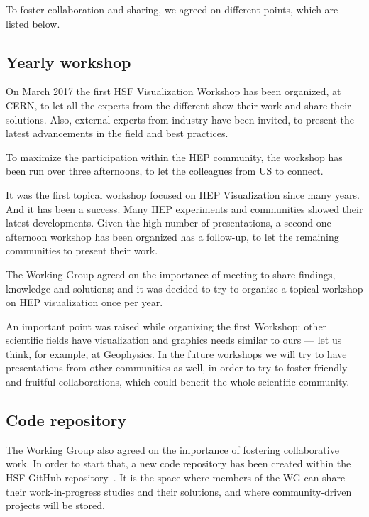\documentclass[12pt,a4paper]{article}
\begin{document}
To foster collaboration and sharing, we agreed on different points, which are listed below.

\hypertarget{workshop}{%
\subsection{Yearly workshop}\label{workshop}}

On March 2017 the first HSF Visualization Workshop has been organized, at CERN, to let all the experts from the different
show their work and share their solutions. Also, external experts from industry have been invited, to present the latest
advancements in the field and best practices.

To maximize the participation within the HEP community, the workshop has been run over three afternoons, to let the
colleagues from US to connect.

It was the first topical workshop focused on HEP Visualization since many years. And it has been a success. Many HEP
experiments and communities showed their latest developments. Given the high number of presentations, a second one-afternoon
workshop has been organized has a follow-up, to let the remaining communities to present their work.

The Working Group agreed on the importance of meeting to share findings, knowledge and solutions; and it was decided to
try to organize a topical workshop on HEP visualization once per year.

An important point was raised while organizing the first Workshop: other scientific fields have visualization and
graphics needs similar to ours --- let us think, for example, at Geophysics. In the future workshops we will try to
have presentations from other communities as well, in order to try to foster friendly and fruitful collaborations,
which could benefit the whole scientific community.

\hypertarget{repo}{%
\subsection{Code repository}\label{repo}}

The Working Group also agreed on the importance of fostering collaborative work.
In order to start that, a new code repository has been created within the HSF GitHub repository~\cite{HSFVizRepo}.
It is the space where members of the WG can share their work-in-progress studies and their solutions, and where
community-driven projects will be stored.
\end{document}
